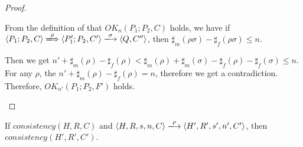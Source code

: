 \begin{proof}
\begin{itemize}
  From the definition of that \(OK_n(P_1;P_2, C)\) holds, we have if
  \( \langle P_1;P_2, C \rangle \xLongrightarrow{\rho} \langle
  P_1';P_2, C' \rangle \xlongrightarrow{\sigma} \langle Q, C'' \rangle
  \), then \(\sharp_m(\rho\sigma) - \sharp_f(\rho\sigma) \le n \).

  Then we get \( n' + \sharp_m(\rho) - \sharp_f(\rho) <
  \sharp_m(\rho) + \sharp_m(\sigma) - \sharp_f(\rho) -
  \sharp_f(\sigma) \le n\). For any \(\rho\), the \( n' +
  \sharp_m(\rho) - \sharp_f(\rho) = n\), therefore we get a
  contradiction. Therefore, \(OK_{n'}(P_1;P_2, F')\) holds.

\end{itemize}
\end{proof}

\begin{lemma}
\label{lem:consistency}
If \(consistency(H, R, C)\) and \(\langle H, R, s, n, C \rangle
\xlongrightarrow{\rho} \langle H', R', s', n', C'\rangle \), then
\(consistency(H', R', C')\).
\end{lemma}

